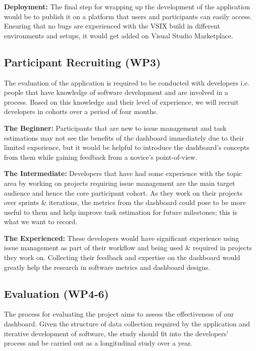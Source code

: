\documentclass{prrcs}
\newcommand{\cmmnt}[1]{}
\begin{document}
\textbf{Deployment:} The final step for wrapping up the development of the application would be to publish it on a platform that users and participants can easily access. Ensuring that no bugs are experienced with the VSIX build in different environments and setups, it would get added on Visual Studio Marketplace.

\subsection*{Participant Recruiting (WP3)}

The evaluation of the application is required to be conducted with developers i.e. people that have knowledge of software development and are involved in a process. Based on this knowledge and their level of experience, we will recruit developers in cohorts over a period of four months\cmmnt{ to ensure a good participant sample}.

\textbf{The Beginner:} Participants that are new to issue management and task estimations may not see the benefits of the dashboard immediately due to their limited experience, but it would be helpful to introduce the dashboard's concepts from them while gaining feedback from a novice's point-of-view.

\textbf{The Intermediate:} Developers that have had some experience with the topic area by working on projects requiring issue management are the main target audience and hence the core participant cohort. As they work on their projects over sprints \& iterations, the metrics from the dashboard could pose to be more useful to them and help improve task estimation for future milestones; this is what we want to record.

\textbf{The Experienced:} These developers would have significant experience using issue management as part of their workflow and being used \& required in projects they work on. Collecting their feedback and expertise on the dashboard would greatly help the research in software metrics and dashboard designs.

\subsection*{Evaluation (WP4-6)}

The process for evaluating the project aims to assess the effectiveness of our dashboard. Given the structure of data collection required by the application and iterative development of software, the study should fit into the developers' process and be carried out as a longitudinal study over a year.
\end{document}
